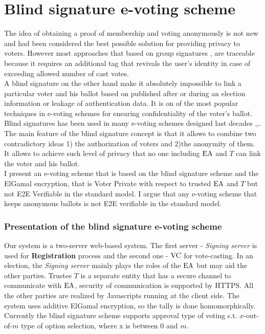 \chapter{Blind signature e-voting scheme}
The idea of obtaining a proof of membership and voting anonymously is not new and had been considered the best possible solution for providing privacy to voters. However most approaches that based on group signatures \cite{Teranishi2009},\cite{Au2013} are traceable because it requires an additional tag that revivals the user's identity in case of exceeding allowed number of cast votes.\\

A blind signature on the other hand make it absolutely impossible to link a particular voter and his ballot based on published after or during an election information or leakage of authentication data.  It is on of the most popular techniques in e-voting schemes for ensuring confidentiality of the voter's ballot. Blind signatures has been used in many e-voting schemes designed last decades \cite{Ion2011},\cite{Ibrahim2003},\cite{Fujioka1993}. The main feature of the blind signature concept is that it allows to combine two contradictory ideas 1) the authorization of voters and 2)the anonymity of them. It allows to achieve such level of privacy that no one including $\operatorname{EA}$ and $T$ can link the voter and his ballot. \\

I present an e-voting scheme that is based on the blind signature scheme and the ElGamal encryption, that is Voter Private with respect to trusted $\operatorname{EA}$ and $T$ but not E2E Verifiable in the standard model. I argue that any e-voting scheme that keeps anonymous ballots is not E2E verifiable in the standard model.
\subsection{Presentation of the blind signature e-voting scheme}
Our system is a two-server web-based system. The first server - \textit{Signing server}  is used for \textbf{Registration} process and the second one  - \textit{$\operatorname{VC}$} for vote-casting.  In an election, the \textit{Signing server} mainly plays the roles of the $\operatorname{EA}$ but may aid the other parties.  Trustee $T$ is a separate entity that has a secure channel to communicate with $\operatorname{EA}$, security of communication is supported by HTTPS. All the other parties are realized by Javascripts running at the client side. The system uses additive ElGamal encryption, so the tally is done homomorphically. Currently the blind signature  scheme supports approval type of voting s.t. $x$-out-of-$m$ type of option selection, where x is between 0 and $m$.

